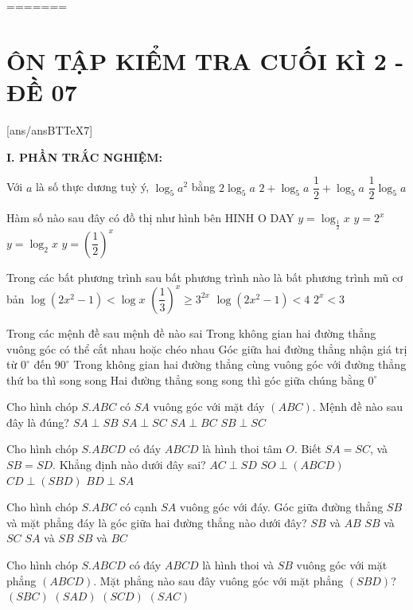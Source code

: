 =======
\section*{ÔN TẬP KIỂM TRA CUỐI KÌ 2 - ĐỀ 07}
\setcounter{ex}{0}\setcounter{bt}{0}
[ans/ansBTTeX7]

\noindent\textbf{I. PHẦN TRẮC NGHIỆM:}
\begin{ex}
Với $a$ là số thực dương tuỳ ý, $\log _5a^2$ bằng
\choice
{$2\log _5a$}
{$2+\log _5a$}
{$\dfrac{1}{2}+\log _5a$}
{$\dfrac{1}{2}\log _5a$}
\end{ex}
\begin{ex}
Hàm số nào sau đây có đồ thị như hình bên
{\centering\color{red} HINH O DAY}
\choice
{$y=\log_{\tfrac{1}{2}}x$}
{$y=2^x$}
{$y=\log _2x$}
{$y=\left(\dfrac{1}{2}\right)^x$}
\end{ex}
\begin{ex}
Trong các bất phương trình sau bất phương trình nào là bất phương trình mũ cơ bản
\choice
{$\log \left(2x^2-1\right)<\log x$}
{${{\left(\dfrac{1}{3}\right)}^x}\ge {3^{2x}}$}
{$\log \left(2x^2-1\right)<4$}
{$2^x<3$}
\end{ex}
\begin{ex}
Trong các mệnh đề sau mệnh đề nào sai
\choice
{Trong không gian hai đường thẳng vuông góc có thể cắt nhau hoặc chéo nhau}
{Góc giữa hai đường thẳng nhận giá trị từ ${0^{\circ }}$ đến ${{90}^{\circ }}$}
{Trong không gian hai đường thẳng cùng vuông góc với đường thẳng thứ ba thì song song}
{Hai đường thẳng song song thì góc giữa chúng bằng ${0^{\circ }}$}
\end{ex}
\begin{ex}
Cho hình chóp $S.ABC$ có $SA$ vuông góc với mặt đáy $(ABC)$. Mệnh đề nào sau đây là đúng?
\choice
{$SA\perp SB$}
{$SA\perp SC$}
{$SA\perp BC$}
{$SB\perp SC$}
\end{ex}
\begin{ex}
Cho hình chóp $S.ABCD$ có đáy $ABCD$ là hình thoi tâm $O$. Biết $SA=SC$, và $SB=SD$. Khẳng định nào dưới đây sai?
\choice
{$AC\perp SD$}
{$SO\perp (ABCD)$}
{$CD\perp (SBD)$}
{$BD\perp SA$}
\end{ex}
\begin{ex}
Cho hình chóp $S.ABC$ có cạnh $SA$ vuông góc với đáy. Góc giữa đường thẳng $SB$ và mặt phẳng đáy là góc giữa hai đường thẳng nào dưới đây?
\choice
{$SB$ và $AB$}
{$SB$ và $SC$}
{$SA$ và $SB$}
{$SB$ và $BC$}
\end{ex}
\begin{ex}
Cho hình chóp $S.ABCD$ có đáy $ABCD$ là hình thoi và $SB$ vuông góc với mặt phẳng $(ABCD)$. Mặt phẳng nào sau đây vuông góc với mặt phẳng $(SBD)$?
\choice
{$(SBC)$}
{$(SAD)$}
{$(SCD)$}
{$(SAC)$}
\end{ex}
